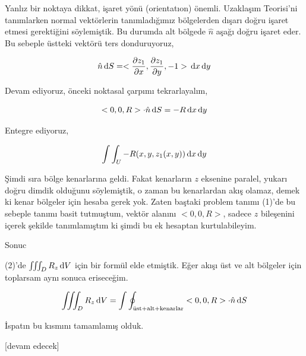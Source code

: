 \documentclass[12pt,fleqn]{article}\usepackage{../../common}
\begin{document}
Yanlız bir noktaya dikkat, işaret yönü (orientatıon) önemli. Uzaklaşım
Teorisi'ni tanımlarken normal vektörlerin tanımladığımız bölgelerden dışarı
doğru işaret etmesi gerektiğini söylemiştik. Bu durumda alt bölgede $\hat{n}$
aşağı doğru işaret eder. Bu sebeple üstteki vektörü ters donduruyoruz,

$$
\hat{n} \,\mathrm{d} S =
<\frac{\partial z_1}{\partial x},
\frac{\partial z_1}{\partial y},
-1 >
\,\mathrm{d} x \,\mathrm{d} y
$$

Devam ediyoruz, önceki noktasal çarpımı tekrarlayalım,

$$
< 0,0,R > \cdot \hat{n} \,\mathrm{d} S = -R \,\mathrm{d} x \,\mathrm{d} y
$$

Entegre ediyoruz,

$$
\int \int_U -R (x,y,z_1(x,y)) \,\mathrm{d} x \,\mathrm{d} y
$$

Şimdi sıra bölge kenarlarına geldi. Fakat kenarların $z$ eksenine paralel,
yukarı doğru dimdik olduğunu söylemiştik, o zaman bu kenarlardan akış olamaz,
demek ki kenar bölgeler için hesaba gerek yok. Zaten baştaki problem tanımı
(1)'de bu sebeple tanımı basit tutmuştum, vektör alanını $< 0,0,R > $,
sadece $z$ bileşenini içerek şekilde tanımlamıştım ki şimdi bu ek hesaptan
kurtulabileyim.

Sonuc

(2)'de $\iiint_D R_z \,\mathrm{d} V$ için bir formül elde etmiştik. Eğer akışı üst
ve alt bölgeler için toplarsam aynı sonuca eriseceğim.

$$
\iiint_D R_z \,\mathrm{d} V = \int \oint_{\textrm{üst+alt+kenarlar}} < 0,0,R >
\cdot \hat{n} \,\mathrm{d} S
$$

İspatın bu kısmını tamamlamış olduk.

[devam edecek]
\end{document}
